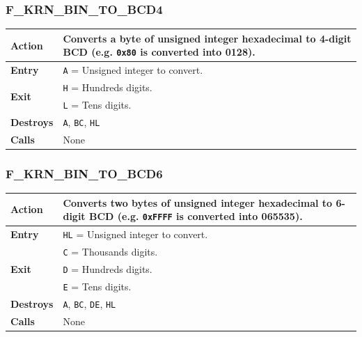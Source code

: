\documentclass[a4paper,11pt]{article}
\begin{document}
        \subsubsection{F\_KRN\_BIN\_TO\_BCD4}
        \label{func:fkrnbintobcd4}
        \begin{tabular}{l p{9cm}}
            \hline\textbf{Action}
            & Converts a byte of unsigned integer hexadecimal to 4-digit BCD
            (e.g. \texttt{0x80} is converted into 0128).\\
            \hline\textbf{Entry} & \texttt{A} = Unsigned integer to convert.\\
            \hline\multirow[t]{2}{4em}{\textbf{Exit}}
            & \texttt{H} = Hundreds digits.\\
            & \texttt{L} = Tens digits.\\
            \hline\textbf{Destroys} & \texttt{A}, \texttt{BC}, \texttt{HL}\\
            \hline\textbf{Calls} & None\\
            \hline
        \end{tabular}

        \subsubsection{F\_KRN\_BIN\_TO\_BCD6}
        \label{func:fkrnbintobcd6}
        \begin{tabular}{l p{9cm}}
            \hline\textbf{Action}
            & Converts two bytes of unsigned integer hexadecimal to 6-digit BCD
            (e.g. \texttt{0xFFFF} is converted into 065535).\\
            \hline\textbf{Entry} & \texttt{HL} = Unsigned integer to convert.\\
            \hline\multirow[t]{3}{4em}{\textbf{Exit}}
            & \texttt{C} = Thousands digits.\\
            & \texttt{D} = Hundreds digits.\\
            & \texttt{E} = Tens digits.\\
            \hline\textbf{Destroys} & \texttt{A}, \texttt{BC}, \texttt{DE}, \texttt{HL}\\
            \hline\textbf{Calls} & None\\
            \hline
        \end{tabular}
\end{document}
